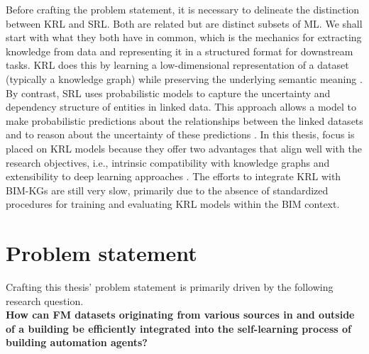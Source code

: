 Before crafting the problem statement, it is necessary to delineate the distinction between \ac{KRL} and \ac{SRL}. Both are related but are distinct subsets of \ac{ML}. We shall start with what they both have in common, which is the mechanics for extracting knowledge from data and representing it in a structured format for downstream tasks. \ac{KRL} does this by learning a low-dimensional representation of a dataset (typically a knowledge graph) while preserving the underlying semantic meaning \citep{Liu2016KnowledgeReview}. By contrast, \ac{SRL} uses probabilistic models to capture the uncertainty and dependency structure of entities in linked data. This approach allows a model to make probabilistic predictions about the relationships between the linked datasets and to reason about the uncertainty of these predictions \cite{Ginestet2010IntroductionLearning}. In this thesis, focus is placed on \ac{KRL} models because they offer two advantages that align well with the research objectives, i.e., intrinsic compatibility with knowledge graphs \citep{Lin2018KnowledgeReview} and extensibility to deep learning approaches \citep{Wang2024LargeSurvey}. The efforts to integrate \ac{KRL} with \acp{BIM-KG} are still very slow, primarily due to the absence of standardized procedures for training and evaluating \ac{KRL} models within the \ac{BIM} context.

\section{Problem statement}
\label{ps}

Crafting this thesis' problem statement is primarily driven by the following research question. \\

\noindent \textbf{How can \ac{FM} datasets originating from various sources in and outside of a building be efficiently integrated into the self-learning process of building automation agents?} \\

